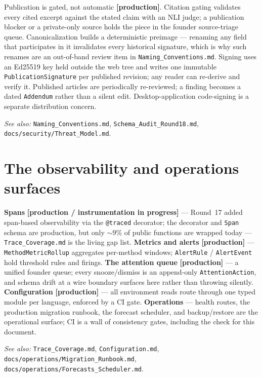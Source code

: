 \documentclass[11pt]{article}
\begin{document}
Publication is gated, not automatic \textbf{[production]}. Citation gating
validates every cited excerpt against the stated claim with an NLI judge; a
publication blocker or a private-only source holds the piece in the founder
source-triage queue. Canonicalization builds a deterministic preimage ---
renaming any field that participates in it invalidates every historical
signature, which is why such renames are an out-of-band review item in
\texttt{Naming\_Conventions.md}. Signing uses an Ed25519 key held outside the
web tree and writes one immutable \texttt{PublicationSignature} per published
revision; any reader can re-derive and verify it. Published articles are
periodically re-reviewed; a finding becomes a dated \texttt{Addendum} rather
than a silent edit. Desktop-application code-signing is a separate
distribution concern.

\textit{See also:} \texttt{Naming\_Conventions.md},
\texttt{Schema\_Audit\_Round18.md}, \texttt{docs/security/Threat\_Model.md}.

\section{The observability and operations surfaces}

\textbf{Spans} \textbf{[production / instrumentation in progress]} --- Round~17
added span-based observability via the \texttt{@traced} decorator; the
decorator and \texttt{Span} schema are production, but only $\sim$9\% of public
functions are wrapped today --- \texttt{Trace\_Coverage.md} is the living gap
list. \textbf{Metrics and alerts} \textbf{[production]} ---
\texttt{MethodMetricRollup} aggregates per-method windows; \texttt{AlertRule} /
\texttt{AlertEvent} hold threshold rules and firings. \textbf{The attention
queue} \textbf{[production]} --- a unified founder queue; every snooze/dismiss
is an append-only \texttt{AttentionAction}, and schema drift at a wire boundary
surfaces here rather than throwing silently. \textbf{Configuration}
\textbf{[production]} --- all environment reads route through one typed module
per language, enforced by a CI gate. \textbf{Operations} --- health routes,
the production migration runbook, the forecast scheduler, and backup/restore
are the operational surface; CI is a wall of consistency gates, including the
check for this document.

\textit{See also:} \texttt{Trace\_Coverage.md}, \texttt{Configuration.md},
\texttt{docs/operations/Migration\_Runbook.md},
\texttt{docs/operations/Forecasts\_Scheduler.md}.
\end{document}
